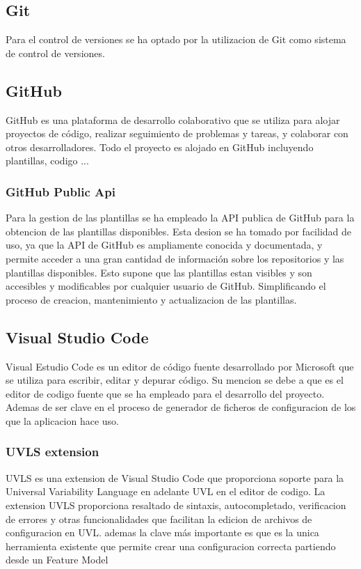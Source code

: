 \documentclass[12pt, a4paper, twoside]{article}
\begin{document}
\subsection{Git}
\cite{git}
Para el control de versiones se ha optado por la utilizacion de Git como sistema de control de versiones.
\subsection{GitHub}
\cite{github}
GitHub es una plataforma de desarrollo colaborativo que se utiliza para alojar proyectos de código, realizar seguimiento de problemas y tareas, y colaborar con otros desarrolladores.
Todo el proyecto es alojado en GitHub incluyendo plantillas, codigo ...
\subsubsection{GitHub Public Api}
\cite{github_rest_api}
Para la gestion de las plantillas se ha empleado la API publica de GitHub para la obtencion de las plantillas disponibles.
Esta desion se ha tomado por facilidad de uso, ya que la API de GitHub es ampliamente conocida y documentada, y permite acceder a una gran cantidad de información sobre los repositorios y las plantillas disponibles.
Esto supone que las plantillas estan visibles y son accesibles y modificables por cualquier usuario de GitHub.
Simplificando el proceso de creacion, mantenimiento y actualizacion de las plantillas. 

\newpage

\subsection{Visual Studio Code}
\cite{vscode}
Visual Estudio Code es un editor de código fuente desarrollado por Microsoft que se utiliza para escribir, editar y depurar código.
Su mencion se debe a que es el editor de codigo fuente que se ha empleado para el desarrollo del proyecto. Ademas de ser clave en el proceso de generador de ficheros de configuracion
de los que la aplicacion hace uso.
\subsubsection{UVLS extension}
\cite{uvls_code}
UVLS es una extension de Visual Studio Code que proporciona soporte para la Universal Variability Language en adelante UVL en el editor de codigo.
La extension UVLS proporciona resaltado de sintaxis, autocompletado, verificacion de errores y otras funcionalidades que facilitan la edicion de archivos de configuracion en UVL.
ademas la clave más importante es que es la unica herramienta existente que permite crear una configuracion correcta partiendo desde un Feature Model
\end{document}
